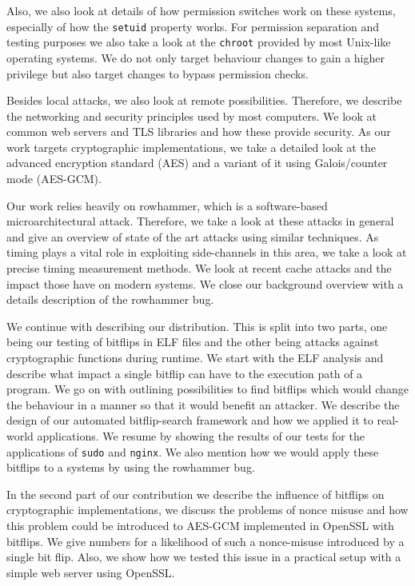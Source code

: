 Also, we also look at details of how permission switches work on these systems,
especially of how the \texttt{setuid} property works. For permission separation
and testing purposes we also take a look at the \texttt{chroot} provided by most
Unix-like operating systems. We do not only target behaviour changes to gain a
higher privilege but also target changes to bypass permission checks.

Besides local attacks, we also look at remote possibilities. Therefore, we
describe the networking and security principles used by most computers. We look
at common web servers and TLS libraries and how these provide security. As our
work targets cryptographic implementations, we take a detailed look at the
advanced encryption standard (AES) and a variant of it using Galois/counter
mode (AES-GCM).

Our work relies heavily on rowhammer, which is a software-based
microarchitectural attack. Therefore, we take a look at these attacks in general
and give an overview of state of the art attacks using similar techniques. As
timing plays a vital role in exploiting side-channels in this area, we take a
look at precise timing measurement methods. We look at recent cache attacks and
the impact those have on modern systems. We close our background overview with a
details description of the rowhammer bug.

We continue with describing our distribution. This is split into two parts, one
being our testing of bitflips in ELF files and the other being attacks against
cryptographic functions during runtime. We start with the ELF analysis and
describe what impact a single bitflip can have to the execution path of a
program. We go on with outlining possibilities to find bitflips which would
change the behaviour in a manner so that it would benefit an attacker. We
describe the design of our automated bitflip-search framework and how we applied
it to real-world applications. We resume by showing the results of our tests for
the applications of \texttt{sudo} and \texttt{nginx}. We also mention how we
would apply these bitflips to a systems by using the rowhammer bug.

In the second part of our contribution we describe the influence of bitflips on
cryptographic implementations, we discuss the problems of nonce misuse and how
this problem could be introduced to AES-GCM implemented in OpenSSL with
bitflips. We give numbers for a likelihood of such a nonce-misuse introduced by
a single bit flip. Also, we show how we tested this issue in a practical setup
with a simple web server using OpenSSL.

